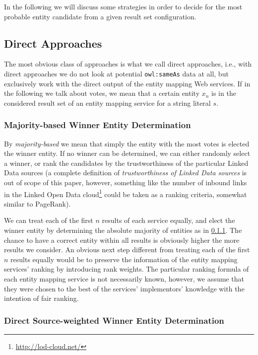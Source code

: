 \documentclass[twocolumn]{article}
\begin{document}
In the following we will discuss some strategies in order to decide for the most probable entity candidate from a given
result set configuration.

\subsection{Direct Approaches}

The most obvious class of approaches is what we call direct approaches, i.e., with direct approaches we do not look at potential \texttt{owl:sameAs} data at all, but exclusively work with the direct output of the entity mapping Web services. If in the following we talk about votes, we mean that a certain entity $x_n$ is in the considered result set of an entity mapping service for a string literal $s$.

\subsubsection{Majority-based Winner Entity Determination}\label{sec:direct}

By \textit{majority-based} we mean that simply the entity with the most votes is elected the winner entity. If no
winner can be determined, we can either randomly select a winner, or rank the candidates by the trustworthiness of the
particular Linked Data sources (a complete definition of \textit{trustworthiness of Linked Data sources} is out of
scope of this paper, however, something like the number of inbound links in the Linked Open Data
cloud\footnote{\url{http://lod-cloud.net/}} could be taken as a ranking criteria, somewhat similar to PageRank).

We can treat each of the first $n$ results of each service equally, and elect the winner entity by determining the
absolute majority of entities as in \ref{sec:direct}. The chance to have a correct entity within all results is
obviously higher the more results we consider. An obvious next step different from treating each of the first $n$
results equally would be to preserve the information of the entity mapping services' ranking by introducing rank
weights. The particular ranking formula of each entity mapping service is not necessarily known, however, we assume
that they were chosen to the best of the services' implementors' knowledge with the intention of fair ranking.

\subsubsection{Direct Source-weighted Winner Entity Determination}
\end{document}
